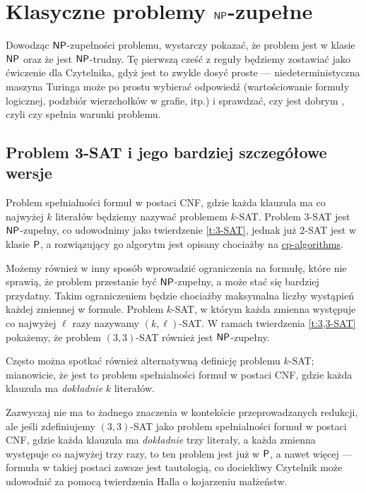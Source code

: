 \section{Klasyczne problemy $\textsf{NP}$-zupełne}

Dowodząc $\textsf{NP}$-zupełności problemu, wystarczy pokazać, że problem jest w klasie $\textsf{NP}$ oraz że jest $\textsf{NP}$-trudny. Tę pierwszą cześć z reguły będziemy zostawiać jako ćwiczenie dla Czytelnika, gdyż jest to zwykle dosyć proste --- niedeterministyczna maszyna Turinga może po prostu wybierać odpowiedź (wartościowanie formuły logicznej, podzbiór wierzchołków w grafie, itp.) i sprawdzać, czy jest dobrym , czyli czy spełnia warunki problemu.

\subsection{Problem 3-SAT i jego bardziej szczegółowe wersje}

Problem spełnialności formuł w postaci CNF, gdzie każda klauzula ma co najwyżej $k$ literałów będziemy nazywać problemem $k$-SAT. Problem 3-SAT jest $\textsf{NP}$-zupełny, co udowodnimy jako twierdzenie \ref{t:3-SAT}, jednak już 2-SAT jest w klasie $\textsf{P}$, a rozwiązujący go algorytm jest opisany chociażby na \href{https://cp-algorithms.com/graph/2SAT.html}{cp-algorithms}.

Możemy również w inny sposób wprowadzić ograniczenia na formułę, które nie sprawią, że problem przestanie być $\textsf{NP}$-zupełny, a może stać się bardziej przydatny.
Takim ograniczeniem będzie chociażby maksymalna liczby wystąpień każdej zmiennej w formule. Problem $k$-SAT, w którym każda zmienna występuje co najwyżej $\ell$ razy nazywamy $(k, \ell)$-SAT. W ramach twierdzenia \ref{t:3,3-SAT} pokażemy, że problem $(3, 3)$-SAT również jest $\textsf{NP}$-zupełny.

\begin{remark}
    Często można spotkać również alternatywną definicję problemu $k$-SAT; mianowicie, że jest to problem spełnialności formuł w postaci CNF, gdzie każda klauzula ma \emph{dokładnie} $k$ literałów.

    Zazwyczaj nie ma to żadnego znaczenia w kontekście przeprowadzanych redukcji, ale jeśli zdefiniujemy $(3, 3)$-SAT jako problem spełnialności formuł w postaci CNF, gdzie każda klauzula ma \emph{dokładnie} trzy literały, a każda zmienna występuje co najwyżej trzy razy, to ten problem jest już w $\textsf{P}$, a nawet więcej --- formuła w takiej postaci zawsze jest tautologią, co dociekliwy Czytelnik może udowodnić za pomocą twierdzenia Halla o kojarzeniu małżeństw.
\end{remark}

